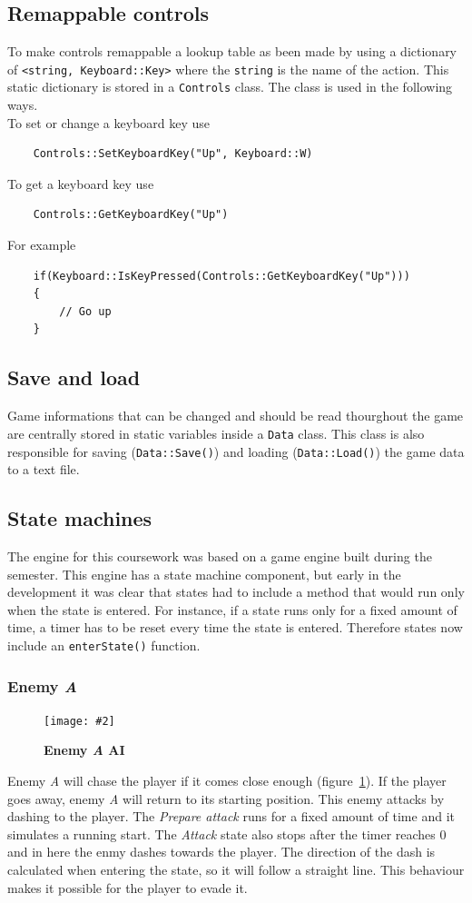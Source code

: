 \documentclass[10pt, a4paper]{article}
\newcommand{\figuremacro}[5]{
    \begin{figure}[#1]
        \centering
        \texttt{[image: \#2]}
        \caption[#3]{\textbf{#3}#4}
        \label{fig:#2}
    \end{figure}
}
\begin{document}
    \subsection{Remappable controls}
    To make controls remappable a lookup table as been made by using a dictionary of \texttt{<string, Keyboard::Key>} where the \texttt{string} is the name of the action.
    This static dictionary is stored in a \texttt{Controls} class. The class is used in the following ways.\\
    To set or change a keyboard key use
    \begin{lstlisting}
    Controls::SetKeyboardKey("Up", Keyboard::W)\end{lstlisting}
    To get a keyboard key use
    \begin{lstlisting}
    Controls::GetKeyboardKey("Up")\end{lstlisting}
    For example
    \begin{lstlisting}
    if(Keyboard::IsKeyPressed(Controls::GetKeyboardKey("Up")))
    {
    	// Go up
    }\end{lstlisting}
    
    \subsection{Save and load}
    Game informations that can be changed and should be read thourghout the game are centrally stored in static variables inside a \texttt{Data} class. This class is also responsible for saving (\texttt{Data::Save()}) and loading (\texttt{Data::Load()}) the game data to a text file.
    
    \subsection{State machines}
    The engine for this coursework was based on a game engine built during the semester. This engine has a state machine component, but early in the development it was clear that states had to include a method that would run only when the state is entered. For instance, if a state runs only for a fixed amount of time, a timer has to be reset every time the state is entered. Therefore states now include an \texttt{enterState()} function.
    
    \subsubsection{Enemy \textit{A}}
    \figuremacro{h}{EnemyA}{Enemy \textit{A} AI}{}{1.0}
    Enemy \textit{A} will chase the player if it comes close enough (figure~\ref{fig:EnemyA}). If the player goes away, enemy \textit{A} will return to its starting position. This enemy attacks by dashing to the player. The \textit{Prepare attack} runs for a fixed amount of time and it simulates a running start. The \textit{Attack} state also stops after the timer reaches 0 and in here the enmy dashes towards the player. The direction of the dash is calculated when entering the state, so it will follow a straight line. This behaviour makes it possible for the player to evade it.
    
\end{document}

